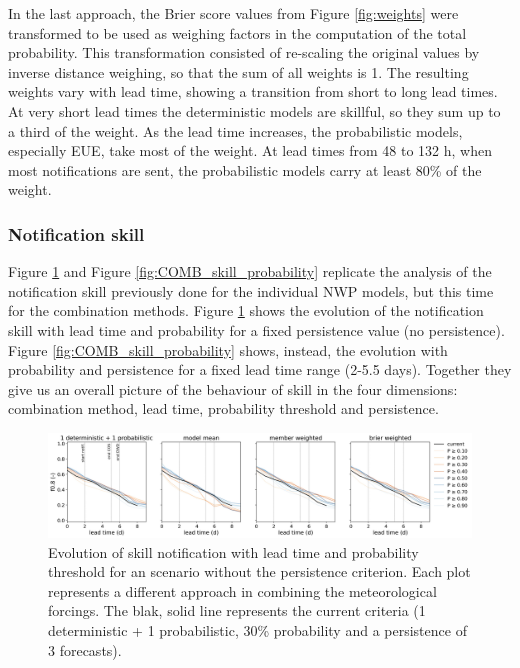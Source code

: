 \documentclass[preprint,12pt]{elsarticle}
\begin{document}
In the last approach, the Brier score values from Figure \ref{fig:weights} were transformed to be used as weighing factors in the computation of the total probability. This transformation consisted of re-scaling the original values by inverse distance weighing, so that the sum of all weights is 1. The resulting weights vary with lead time, showing a transition from short to long lead times. At very short lead times the deterministic models are skillful, so they sum up to a third of the weight. As the lead time increases, the probabilistic models, especially EUE, take most of the weight. At lead times from 48 to 132 h, when most notifications are sent, the probabilistic models carry at least 80\% of the weight.

\subsubsection{Notification skill}

Figure \ref{fig:COMB_skill_leadtime} and Figure \ref{fig:COMB_skill_probability} replicate the analysis of the notification skill previously done for the individual NWP models, but this time for the combination methods. Figure \ref{fig:COMB_skill_leadtime} shows the evolution of the notification skill with lead time and probability for a fixed persistence value (no persistence). Figure \ref{fig:COMB_skill_probability} shows, instead, the evolution with probability and persistence for a fixed lead time range (2-5.5 days). Together they give us an overall picture of the behaviour of skill in the four dimensions: combination method, lead time, probability threshold and persistence.

\begin{figure}
    \centering
    \includegraphics[width=1\textwidth]{figures/skill_probability_leadtime_1-1_COMB.jpg}
    \caption{Evolution of skill notification with lead time and probability threshold for an scenario without the persistence criterion. Each plot represents a different approach in combining the meteorological forcings. The blak, solid line represents the current criteria (1 deterministic + 1 probabilistic, 30\% probability and a persistence of 3 forecasts).}
    \label{fig:COMB_skill_leadtime}
\end{figure}
\end{document}
